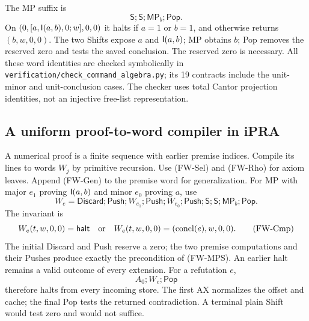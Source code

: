 The MP suffix is
\[
 \mathsf S;\mathsf S;\mathsf{MP}_b;\mathsf{Pop}.          \tag{FW-MPS}
\]
On $(0,[a,\mathsf I(a,b),0;w],0,0)$ it halts if $a=1$ or $b=1$,
and otherwise returns $(b,w,0,0)$.  The two Shifts expose $a$ and
$\mathsf I(a,b)$; MP obtains $b$; Pop removes the reserved zero and tests
the saved conclusion.  The reserved zero is necessary.  All these
word identities are checked symbolically in
\texttt{verification/check\_command\_algebra.py}; its 19 contracts
include the unit-minor and unit-conclusion cases.  The checker uses total
Cantor projection identities, not an injective free-list representation.

\subsection{A uniform proof-to-word compiler in iPRA}

A numerical proof is a finite sequence with earlier premise indices.
Compile its lines to words $W_j$ by primitive recursion.  Use (FW-Sel)
and (FW-Rho) for axiom leaves.  Append (FW-Gen) to the premise word for
generalization.  For MP with major $e_1$ proving $\mathsf I(a,b)$ and minor
$e_0$ proving $a$, use
\[
 W_e=\mathsf{Discard};\mathsf{Push};W_{e_1};\mathsf{Push};
 W_{e_0};\mathsf{Push};\mathsf S;\mathsf S;
 \mathsf{MP}_b;\mathsf{Pop}.                             \tag{FW-Compile}
\]
The invariant is
\[
 W_e(t,w,0,0)=\mathsf{halt}\quad\hbox{or}\quad
 W_e(t,w,0,0)=(\operatorname{concl}(e),w,0,0).            \tag{FW-Cmp}
\]
The initial Discard and Push reserve a zero; the two premise computations
and their Pushes produce exactly the precondition of (FW-MPS).  An earlier
halt remains a valid outcome of every extension.  For a refutation $e$,
\[
                          A_0;W_e;\mathsf{Pop}             \tag{FW-Ref}
\]
therefore halts from every incoming store.  The first AX normalizes the
offset and cache; the final Pop tests the returned contradiction.  A
terminal plain Shift would test zero and would not suffice.

